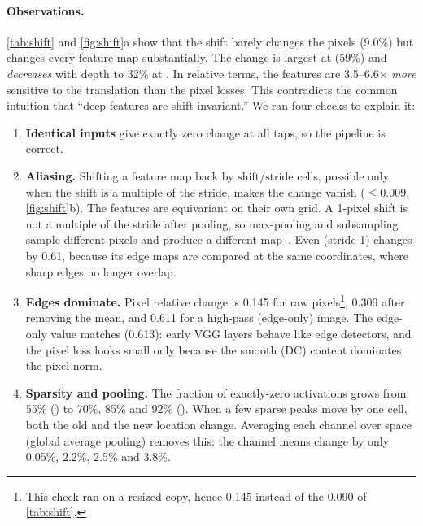 \documentclass[10pt,twocolumn,letterpaper]{article}
\begin{document}
\paragraph{Observations.}
\cref{tab:shift} and \cref{fig:shift}a show that the shift barely changes the pixels (9.0\%) but changes every feature map substantially. The change is largest at  (59\%) and \emph{decreases} with depth to 32\% at . In relative terms, the features are 3.5--6.6$\times$ \emph{more} sensitive to the translation than the pixel losses. This contradicts the common intuition that ``deep features are shift-invariant.'' We ran four checks to explain it:
\begin{enumerate}[nosep,leftmargin=*]
\item \textbf{Identical inputs} give exactly zero change at all taps, so the pipeline is correct.
\item \textbf{Aliasing.} Shifting a feature map back by $\text{shift}/\text{stride}$ cells, possible only when the shift is a multiple of the stride, makes the change vanish ($\le 0.009$, \cref{fig:shift}b). The features are equivariant on their own grid. A 1-pixel shift is not a multiple of the stride after pooling, so max-pooling and subsampling sample different pixels and produce a different map~\cite{zhang2019blurpool}. Even  (stride 1) changes by 0.61, because its edge maps are compared at the same coordinates, where sharp edges no longer overlap.
\item \textbf{Edges dominate.} Pixel relative change is 0.145 for raw pixels\footnote{This check ran on a resized copy, hence 0.145 instead of the 0.090 of \cref{tab:shift}.}, 0.309 after removing the mean, and 0.611 for a high-pass (edge-only) image. The edge-only value matches  (0.613): early VGG layers behave like edge detectors, and the pixel loss looks small only because the smooth (DC) content dominates the pixel norm.
\item \textbf{Sparsity and pooling.} The fraction of exactly-zero activations grows from 55\% () to 70\%, 85\% and 92\% (). When a few sparse peaks move by one cell, both the old and the new location change. Averaging each channel over space (global average pooling) removes this: the channel means change by only 0.05\%, 2.2\%, 2.5\% and 3.8\%.
\end{enumerate}
\end{document}
